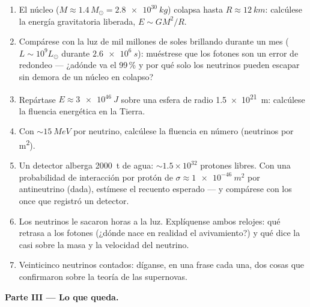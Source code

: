 \begin{problem}
\begin{enumerate}[resume]
  \item El núcleo ($M \approx 1.4\,M_\odot = \qty{2.8e30}{kg}$)
        colapsa hasta $R \approx \qty{12}{km}$: calcúlese la
        energía gravitatoria liberada, $E \sim GM^2/R$.
  \item Compárese con la luz de mil millones de soles brillando durante un
        mes ($L \sim 10^{9}L_\odot$ durante $\qty{2.6e6}{s}$):
        muéstrese que los fotones son un error de redondeo --- ¿adónde
        va el 99\,\% y por qué solo los neutrinos pueden escapar sin demora de un
        núcleo en colapso?
  \item Repártase $E \approx \qty{3e46}{J}$ sobre una esfera de
        radio \qty{1.5e21}{m}: calcúlese la fluencia energética en la
        Tierra.
  \item Con $\sim\qty{15}{MeV}$ por neutrino, calcúlese la
        fluencia en número (neutrinos por \unit{m^2}).
  \item Un detector alberga \qty{2000}{t} de agua:
        ${\sim}1.5\times10^{32}$ protones libres. Con una
        probabilidad de interacción por protón de
        $\sigma \approx \qty{1e-46}{m^2}$ por antineutrino
        (dada), estímese el recuento esperado --- y compárese
        con los once que registró un detector.
  \item Los neutrinos le sacaron horas a la luz. Explíquense ambos
        relojes: qué retrasa a los fotones (¿dónde nace en realidad el
        avivamiento?) y qué dice la
        casi  sobre la masa y la velocidad del
        neutrino.
  \item Veinticinco neutrinos contados: díganse, en una frase
        cada una, dos cosas que confirmaron sobre la teoría de las supernovas.
\end{enumerate}

\medskip\noindent\textbf{Parte III --- Lo que queda.}


\end{problem}
